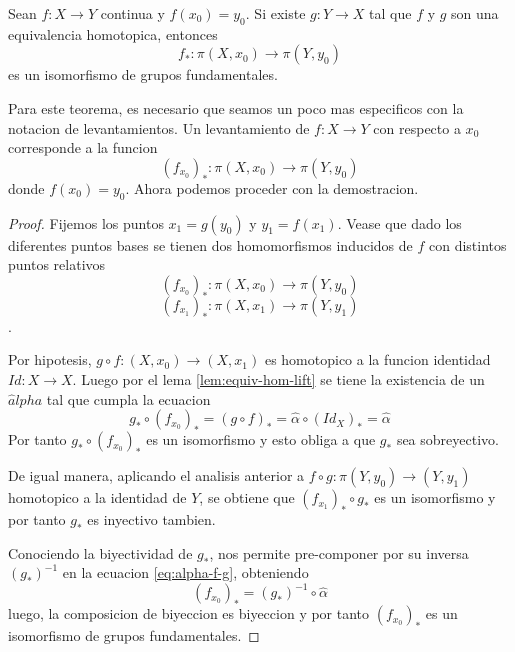 \begin{teorema}
  Sean \(f : X \to Y\) continua y \(f (x_0) = y_0\). Si existe \(g : Y
  \to X\) tal que \(f\) y \(g\) son una equivalencia homotopica, entonces
  \[ f_* : \pi (X, x_0) \to \pi (Y, y_0)\]
  es un isomorfismo de grupos fundamentales.
\end{teorema}
Para este teorema, es necesario que seamos un poco mas especificos con la
notacion de levantamientos. Un levantamiento de \(f :
X \to Y\) con respecto a \(x_0\) corresponde a la funcion
\[ (f_{x_0})_{*} : \pi (X , x_0) \to \pi (Y, y_0)\]
donde \(f(x_0) = y_0\). Ahora podemos proceder con la demostracion.
\begin{proof}
  Fijemos los puntos \(x_1 = g(y_0)\) y \(y_1 = f(x_1)\). Vease que dado
  los diferentes puntos bases se tienen dos homomorfismos inducidos de
  \(f\) con distintos puntos relativos \[(f_{x_0})_* : \pi (X, x_0) \to \pi
  (Y, y_0)\] \[(f_{x_1})_* : \pi (X, x_1) \to \pi (Y, y_1)\].

  Por hipotesis, \(g \circ f : (X, x_0) \to (X, x_1)\) es homotopico a
  la funcion identidad \(Id : X \to X\). Luego por el lema
  \ref{lem:equiv-hom-lift} se tiene la existencia de un \(\hat alpha\)
  tal que cumpla la ecuacion
  \begin{equation} \label{eq:alpha-f-g}
  g_* \circ (f_{x_0})_* = (g \circ f)_* = \hat \alpha \circ (Id_X)_*
    = \hat \alpha
  \end{equation}
  Por tanto \(g_* \circ (f_{x_0})_*\) es un isomorfismo y esto obliga a
  que \(g_*\) sea sobreyectivo.

  De igual manera, aplicando el analisis anterior a \(f \circ g : \pi
  (Y, y_0) \to (Y, y_1)\) homotopico a la identidad de \(Y\), se
  obtiene que \((f_{x_1})_* \circ g_*\) es un isomorfismo y por tanto
  \(g_*\) es inyectivo tambien.

  Conociendo la biyectividad de \(g_*\), nos permite pre-componer por su
  inversa \((g_*)^{-1}\) en la ecuacion \eqref{eq:alpha-f-g}, obteniendo
  \[ (f_{x_0})_* = (g_*)^{-1} \circ \hat \alpha\]
  luego, la composicion de biyeccion es biyeccion y por tanto
  \((f_{x_0})_*\) es un isomorfismo de grupos fundamentales.
\end{proof}

